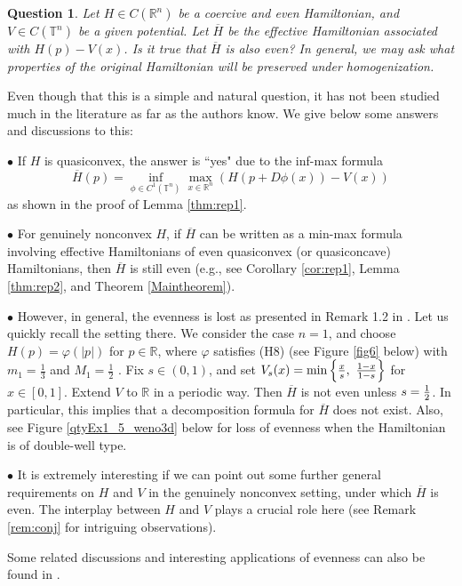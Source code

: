 \documentclass[12pt,reqno]{amsart}
\theoremstyle{plain}
\newtheorem{quest}{Question}
\theoremstyle{remark}
\numberwithin{equation}{section}
\newcommand{\R}{\mathbb{R}}
\newcommand{\T}{\mathbb{T}}
\newcommand{\ol}{\overline}
\begin{document}
\begin{quest}\label{quest:even}
Let $H \in C(\R ^n)$ be a coercive and even Hamiltonian,  and $V\in C(\T^n)$ be a given potential.
Let $\ol{H}$ be the effective Hamiltonian associated with $H(p)-V(x)$.
Is it true that  $\ol H$  is also even?  In general,  we may ask  what  properties of the original Hamiltonian  will  be preserved under homogenization.  

\end{quest}

Even though that this is a simple and natural question, it has not been studied much in the literature as far as the authors know.
We give below some answers and discussions to this:

\smallskip

$\bullet$  If $H$ is quasiconvex,  the answer is ``yes"  due to the inf-max formula
\[
\ol{H}(p)= \inf_{\phi \in C^1(\T^n)} \max_{x \in \R^n} \left ( H(p+D\phi(x)) - V(x) \right)
\]
as shown in the proof of Lemma \ref{thm:rep1}.

$\bullet$  For  genuinely nonconvex $H$,  if  $\ol{H}$ can be written as a min-max formula involving effective Hamiltonians of even quasiconvex (or quasiconcave) Hamiltonians,
then  $\ol H$ is still even (e.g.,  see Corollary \ref{cor:rep1}, Lemma \ref{thm:rep2}, and Theorem \ref{Maintheorem}). 

$\bullet$  However, in general, the evenness is lost as presented in  Remark 1.2 in  \cite{LTY}.
Let us quickly recall the setting there.
We consider the case $n=1$, and choose  $H(p)=\varphi(|p|)$ for $p\in\R$, where $\varphi$ satisfies (H8)  (see Figure \ref{fig6} below)
with $m_1=\frac{1}{3}$ and $M_1=\frac{1}{2}$ .
Fix $s\in (0,1)$, and set $V_s(x)=\min\left\{{x\over s},\  {1-x\over 1-s}\right\}$ for $x\in  [0,1]$. 
Extend $V$ to $\R$ in a periodic way. 
Then  $\ol H$ is not even unless $s={1\over 2}$. 
In particular, this implies that a decomposition formula for $\ol H$ does not exist.  Also, see Figure \ref{qtyEx1_5_weno3d} below for loss of evenness when the Hamiltonian is of double-well type.  


$\bullet$  It is extremely interesting if we can point out some further general requirements on $H$ and $V$
in the genuinely nonconvex setting, under which $\ol{H}$ is  even.
The interplay between $H$ and $V$ plays a crucial role here (see Remark \ref{rem:conj} for intriguing observations). 

Some related  discussions  and  interesting applications of evenness can also be found in  \cite{See}. 
\end{document}
